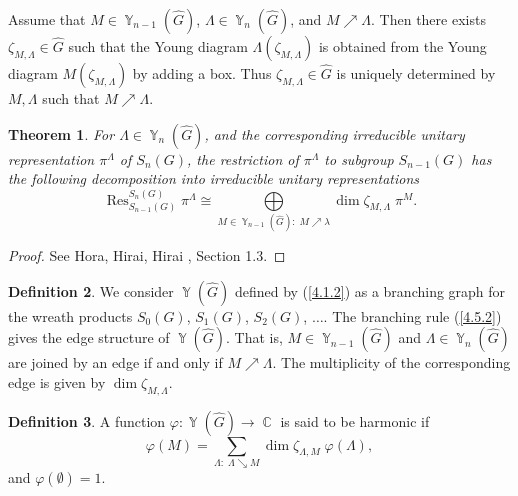 \documentclass[12pt]{amsart}
\newtheorem{thm}{Theorem}[section]
\theoremstyle{definition}
\newtheorem{defn}[thm]{Definition}
\numberwithin{equation}{section}
\DeclareMathOperator{\Res}{Res}
\DeclareMathOperator{\Y}{\mathbb{Y}}
\DeclareMathOperator{\C}{\mathbb{C}}
\begin{document}
Assume that $M\in\Y_{n-1}(\widehat{G})$, $\Lambda\in\Y_n(\widehat{G})$, and $M\nearrow\Lambda$.
Then there exists $\zeta_{M,\Lambda}\in\widehat{G}$ such that the Young diagram $\Lambda(\zeta_{M,\Lambda})$ is obtained
from the Young diagram $M\left(\zeta_{M,\Lambda}\right)$ by adding a box. Thus $\zeta_{M,\Lambda}\in\widehat{G}$
is uniquely determined by $M,\Lambda$ such that $M\nearrow\Lambda$.
\begin{thm}\label{THEOREM4.5.1}
For $\Lambda\in\Y_n(\widehat{G})$, and the corresponding irreducible unitary representation $\pi^{\Lambda}$ of $S_n(G)$,
the restriction of $\pi^{\Lambda}$ to subgroup $S_{n-1}(G)$ has the following decomposition into irreducible unitary
representations
\begin{equation}\label{4.5.2}
\Res_{S_{n-1}(G)}^{S_n(G)}\pi^{\Lambda}\cong\underset{M\in\Y_{n-1}(\widehat{G}):\; M\nearrow\lambda}{\bigoplus}\dim\zeta_{M,\Lambda}\;\pi^{M}.
\end{equation}
\end{thm}
\begin{proof} See  Hora, Hirai, Hirai \cite{HoraHiraiHiraiII}, Section 1.3.
\end{proof}
\begin{defn}We consider  $\Y(\widehat{G})$ defined by (\ref{4.1.2}) as a branching graph for the wreath
products $S_0(G)$, $S_1(G)$, $S_2(G)$, $\ldots$. The branching rule (\ref{4.5.2}) gives the edge structure of $\Y(\widehat{G})$. That is, $M\in\Y_{n-1}(\widehat{G})$ and $\Lambda\in\Y_n(\widehat{G})$ are joined by an edge if and only if $M\nearrow\Lambda$. The multiplicity of the corresponding edge is given by $\dim\zeta_{M,\Lambda}$.
\end{defn}
\begin{defn} A function $\varphi: \Y(\widehat{G})\rightarrow\C$ is said to be harmonic if
\begin{equation}\label{4.7.2}
\varphi(M)=\sum\limits_{\Lambda:\; \Lambda\searrow M}\dim\zeta_{\Lambda,M}\;\varphi(\Lambda),
\end{equation}
and $\varphi(\emptyset)=1$.
\end{defn}
\end{document}
